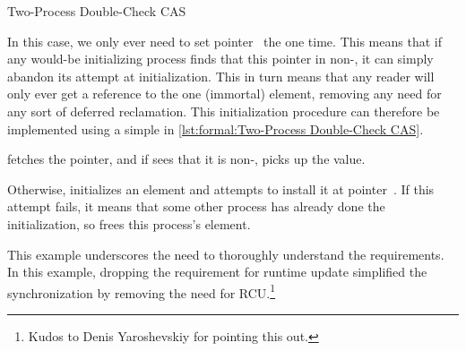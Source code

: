 \begin{listing}
\caption{Two-Process Double-Check CAS}
\label{lst:formal:Two-Process Double-Check CAS}
\end{listing}

In this case, we only ever need to set pointer~ the one time.
This means that if any would-be initializing process finds that
this pointer in non-, it can simply abandon its attempt at
initialization.
This in turn means that any reader will only ever get a reference to
the one (immortal) element, removing any need for any sort of deferred
reclamation.
This initialization procedure can therefore be implemented using a simple
 in \cref{lst:formal:Two-Process Double-Check CAS}.

\begin{fcvref}
 fetches the pointer, and if  sees that it is
non-,  picks up the value.

Otherwise,  initializes an element and 
attempts to install it at pointer~.
If this attempt fails, it means that some other process has already done
the initialization, so  frees this process's element.
\end{fcvref}

\QuickQuizEnd

This example underscores the need to thoroughly understand the
requirements.
In this example, dropping the requirement for runtime update simplified
the synchronization by removing the need for RCU\@.\footnote{
	Kudos to Denis Yaroshevskiy for pointing this out.}

